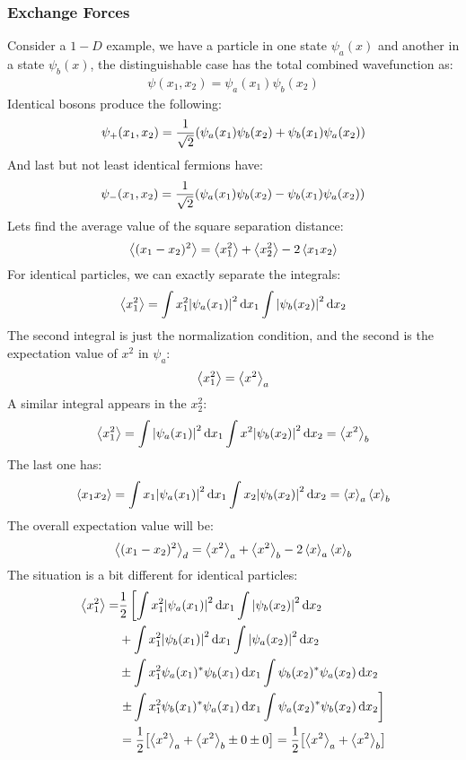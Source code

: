 \subsubsection{Exchange Forces}
Consider a $1-D$ example, we have a particle in one state $\psi_a(x)$ and another in a state $\psi_b(x)$, the distinguishable case has the total combined wavefunction as:
\begin{align*}
  \psi(x_1,x_2)=\psi_a(x_1)\psi_b(x_2)
\end{align*}
Identical bosons produce the following:
\begin{align*}
  \psi_+(x_1,x_2)=\dfrac{1}{\sqrt{2}}\qty(\psi_a(x_1)\psi_b(x_2)+\psi_b(x_1)\psi_a(x_2))
\end{align*}
And last but not least identical fermions have:
\begin{align*}
  \psi_-(x_1,x_2)=\dfrac{1}{\sqrt{2}}\qty(\psi_a(x_1)\psi_b(x_2)-\psi_b(x_1)\psi_a(x_2))
\end{align*}
Lets find the average value of the square separation distance:
\begin{align*}
  \ev{(x_1-x_2)^2}=\ev{x_1^2}+\ev{x_2^2}-2\ev{x_1x_2}
\end{align*}
For identical particles, we can exactly separate the integrals:
\begin{align*}
  \ev{x_1^2}=\int x_1^2\abs{\psi_a(x_1)}^2\dd{x_1}\int\abs{\psi_b(x_2)}^2\dd{x_2}
\end{align*}
The second integral is just the normalization condition, and the second is the expectation value of $x^2$ in $\psi_a$:
\begin{align*}
  \ev{x_1^2}=\ev{x^2}_a
\end{align*}
A similar integral appears in the $x_2^2$:
\begin{align*}
  \ev{x_1^2}=\int\abs{\psi_a(x_1)}^2\dd{x_1}\int x^2\abs{\psi_b(x_2)}^2\dd{x_2}=\ev{x^2}_b
\end{align*}
The last one has:
\begin{align*}
  \ev{x_1x_2}=\int x_1\abs{\psi_a(x_1)}^2\dd{x_1}\int x_2\abs{\psi_b(x_2)}^2\dd{x_2}=
  \ev{x}_a\ev{x}_b
\end{align*}
The overall expectation value will be:
\begin{align*}
  \ev{(x_1-x_2)^2}_d=\ev{x^2}_a+\ev{x^2}_b-2\ev{x}_a\ev{x}_b
\end{align*}
The situation is a bit different for identical particles:
\begin{align*}
  \ev{x_1^2}=&\dfrac{1}{2}
  \left[\int x_1^2\abs{\psi_a(x_1)}^2\dd{x_1}\int\abs{\psi_b(x_2)}^2\dd{x_2}\right.\\
    &+\int x_1^2\abs{\psi_b(x_1)}^2\dd{x_1}\int\abs{\psi_a(x_2)}^2\dd{x_2}\\
    &\pm\int x_1^2\psi_a(x_1)^*\psi_b(x_1)\dd{x_1}\int\psi_b(x_2)^*\psi_a(x_2)\dd{x_2}\\
    &\left.\pm\int x_1^2\psi_b(x_1)^*\psi_a(x_1)\dd{x_1}\int\psi_a(x_2)^*\psi_b(x_2)
    \dd{x_2} \right]\\
  &=\dfrac{1}{2}\qty[\ev{x^2}_a+\ev{x^2}_b\pm0\pm0]
  =\dfrac{1}{2}\qty[\ev{x^2}_a+\ev{x^2}_b]
\end{align*}
